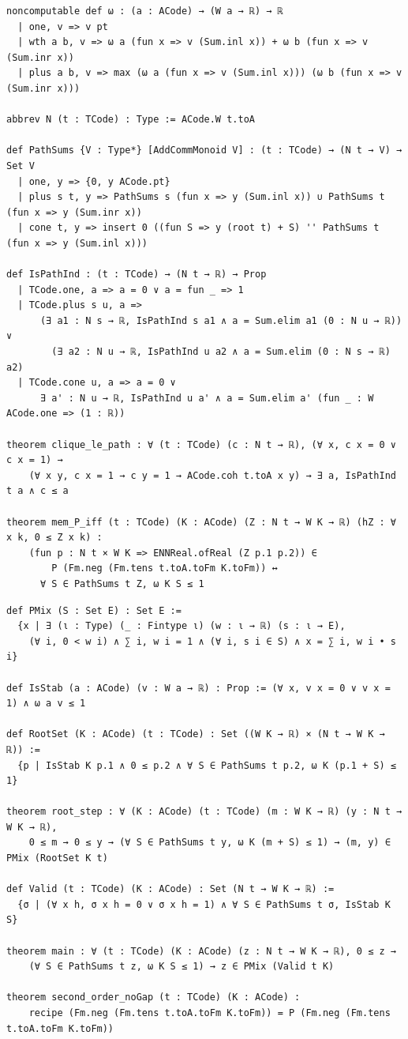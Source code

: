 \begin{lstlisting}
noncomputable def ω : (a : ACode) → (W a → ℝ) → ℝ
  | one, v => v pt
  | wth a b, v => ω a (fun x => v (Sum.inl x)) + ω b (fun x => v (Sum.inr x))
  | plus a b, v => max (ω a (fun x => v (Sum.inl x))) (ω b (fun x => v (Sum.inr x)))

abbrev N (t : TCode) : Type := ACode.W t.toA

def PathSums {V : Type*} [AddCommMonoid V] : (t : TCode) → (N t → V) → Set V
  | one, y => {0, y ACode.pt}
  | plus s t, y => PathSums s (fun x => y (Sum.inl x)) ∪ PathSums t (fun x => y (Sum.inr x))
  | cone t, y => insert 0 ((fun S => y (root t) + S) '' PathSums t (fun x => y (Sum.inl x)))

def IsPathInd : (t : TCode) → (N t → ℝ) → Prop
  | TCode.one, a => a = 0 ∨ a = fun _ => 1
  | TCode.plus s u, a =>
      (∃ a1 : N s → ℝ, IsPathInd s a1 ∧ a = Sum.elim a1 (0 : N u → ℝ)) ∨
        (∃ a2 : N u → ℝ, IsPathInd u a2 ∧ a = Sum.elim (0 : N s → ℝ) a2)
  | TCode.cone u, a => a = 0 ∨
      ∃ a' : N u → ℝ, IsPathInd u a' ∧ a = Sum.elim a' (fun _ : W ACode.one => (1 : ℝ))

theorem clique_le_path : ∀ (t : TCode) (c : N t → ℝ), (∀ x, c x = 0 ∨ c x = 1) →
    (∀ x y, c x = 1 → c y = 1 → ACode.coh t.toA x y) → ∃ a, IsPathInd t a ∧ c ≤ a

theorem mem_P_iff (t : TCode) (K : ACode) (Z : N t → W K → ℝ) (hZ : ∀ x k, 0 ≤ Z x k) :
    (fun p : N t × W K => ENNReal.ofReal (Z p.1 p.2)) ∈
        P (Fm.neg (Fm.tens t.toA.toFm K.toFm)) ↔
      ∀ S ∈ PathSums t Z, ω K S ≤ 1
\end{lstlisting}

\begin{lstlisting}
def PMix (S : Set E) : Set E :=
  {x | ∃ (ι : Type) (_ : Fintype ι) (w : ι → ℝ) (s : ι → E),
    (∀ i, 0 < w i) ∧ ∑ i, w i = 1 ∧ (∀ i, s i ∈ S) ∧ x = ∑ i, w i • s i}

def IsStab (a : ACode) (v : W a → ℝ) : Prop := (∀ x, v x = 0 ∨ v x = 1) ∧ ω a v ≤ 1

def RootSet (K : ACode) (t : TCode) : Set ((W K → ℝ) × (N t → W K → ℝ)) :=
  {p | IsStab K p.1 ∧ 0 ≤ p.2 ∧ ∀ S ∈ PathSums t p.2, ω K (p.1 + S) ≤ 1}

theorem root_step : ∀ (K : ACode) (t : TCode) (m : W K → ℝ) (y : N t → W K → ℝ),
    0 ≤ m → 0 ≤ y → (∀ S ∈ PathSums t y, ω K (m + S) ≤ 1) → (m, y) ∈ PMix (RootSet K t)

def Valid (t : TCode) (K : ACode) : Set (N t → W K → ℝ) :=
  {σ | (∀ x h, σ x h = 0 ∨ σ x h = 1) ∧ ∀ S ∈ PathSums t σ, IsStab K S}

theorem main : ∀ (t : TCode) (K : ACode) (z : N t → W K → ℝ), 0 ≤ z →
    (∀ S ∈ PathSums t z, ω K S ≤ 1) → z ∈ PMix (Valid t K)

theorem second_order_noGap (t : TCode) (K : ACode) :
    recipe (Fm.neg (Fm.tens t.toA.toFm K.toFm)) = P (Fm.neg (Fm.tens t.toA.toFm K.toFm))
\end{lstlisting}

